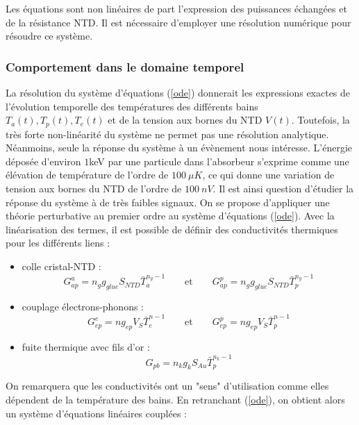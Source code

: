 Les équations sont non linéaires de part l'expression des puissances échangées et de la résistance NTD. Il est nécessaire d'employer une résolution numérique pour résoudre ce système. 


\subsubsection{Comportement dans le domaine temporel}
\label{temporal}


La résolution du système d'équations (\ref{ode}) donnerait les expressions exactes de l'évolution temporelle des températures des différents bains $T_a(t), T_p(t), T_e(t)$ et de la tension aux bornes du NTD $V(t)$. Toutefois, la très forte non-linéarité du système ne permet pas une résolution analytique. Néanmoins, seule la réponse du système à un évènement nous intéresse. L'énergie déposée d'environ $1$keV par une particule dans l'absorbeur s'exprime comme une élévation de température de l'ordre de $100~\mu K$, ce qui donne une variation de tension aux bornes du NTD de l'ordre de $100~nV$. Il est ainsi question d'étudier la réponse du système à de très faibles signaux. On se propose d'appliquer une théorie perturbative au premier ordre au système d'équations (\ref{ode}). Avec la linéarisation des termes, il est possible de définir des conductivités thermiques pour les différents liens :
\begin{itemize}
\item colle cristal-NTD : \begin{equation}\label{g1} G_{ap}^a  = n_g g_{glue} S_{NTD} \bar{T}_a^{n_g-1} \qquad \textrm{et} \qquad G_{ap}^p  = n_g g_{glue} S_{NTD} \bar{T}_p^{n_g-1}
\end{equation}
\item couplage électrons-phonons : \begin{equation}\label{g2} G_{ep}^e  = n g_{ep} V_S \bar{T}_e^{n-1} \qquad \textrm{et} \qquad G_{ep}^p  = n g_{ep} V_S \bar{T}_p^{n-1}
\end{equation}
\item fuite thermique avec fils d'or : \begin{equation}\label{g3} G_{pb} = n_k g_{k} S_{Au} \bar{T}_p^{n_k-1}
\end{equation}
\end{itemize}
On remarquera que les conductivités ont un "sens" d'utilisation comme elles dépendent de la température des bains. En retranchant (\ref{ode}), on obtient alors un système d'équations linéaires couplées :
